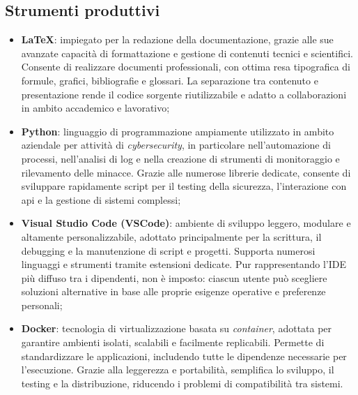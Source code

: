\subsection{Strumenti produttivi}
\begin{itemize}
    \item \textbf{LaTeX}: impiegato per la redazione della documentazione, grazie alle sue avanzate capacità di formattazione e gestione di contenuti tecnici e scientifici. Consente di realizzare documenti professionali, con ottima resa tipografica di formule, grafici, bibliografie e glossari. La separazione tra contenuto e presentazione rende il codice sorgente riutilizzabile e adatto a collaborazioni in ambito accademico e lavorativo;
    \item \textbf{Python}: linguaggio di programmazione ampiamente utilizzato in ambito aziendale per attività di \textit{cybersecurity}, in particolare nell'automazione di processi, nell'analisi di log e nella creazione di strumenti di monitoraggio e rilevamento delle minacce. Grazie alle numerose librerie dedicate, consente di sviluppare rapidamente script per il testing della sicurezza, l'interazione con \gls{api} e la gestione di sistemi complessi;
    \item \textbf{Visual Studio Code (VSCode)}: ambiente di sviluppo leggero, modulare e altamente personalizzabile, adottato principalmente per la scrittura, il debugging e la manutenzione di script e progetti. Supporta numerosi linguaggi e strumenti tramite estensioni dedicate. Pur rappresentando l'IDE più diffuso tra i dipendenti, non è imposto: ciascun utente può scegliere soluzioni alternative in base alle proprie esigenze operative e preferenze personali;
    \item \textbf{Docker}: tecnologia di virtualizzazione basata su \textit{\gls{container}}, adottata per garantire ambienti isolati, scalabili e facilmente replicabili. Permette di standardizzare le applicazioni, includendo tutte le dipendenze necessarie per l'esecuzione. Grazie alla leggerezza e portabilità, semplifica lo sviluppo, il testing e la distribuzione, riducendo i problemi di compatibilità tra sistemi.
\end{itemize}
